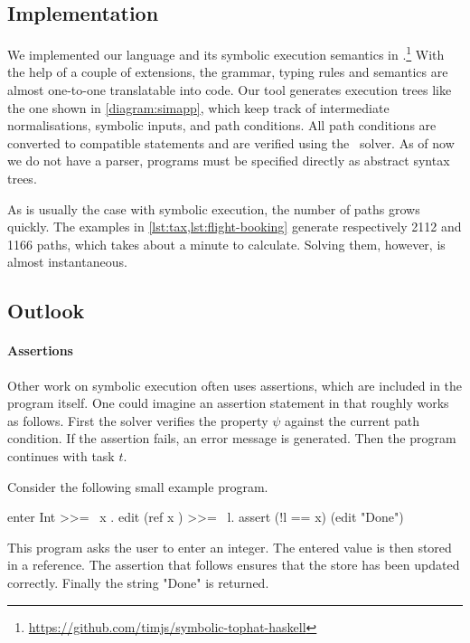 \subsection{Implementation}

We implemented our language and its symbolic execution semantics in \HASKELL.\footnote{\url{https://github.com/timjs/symbolic-tophat-haskell}}
With the help of a couple of \GHC extensions, the grammar, typing rules and semantics are almost one-to-one translatable into code.
Our tool generates execution trees like the one shown in \cref{diagram:simapp},
which keep track of intermediate normalisations, symbolic inputs, and path conditions.
All path conditions are converted to \SMTLIB compatible statements and are verified using the \ZTHREE \SMT~solver.
As of now we do not have a parser, programs must be specified directly as abstract syntax trees.

As is usually the case with symbolic execution, the number of paths grows quickly.
The examples in \cref{lst:tax,lst:flight-booking} generate respectively 2112 and 1166 paths,
which takes about a minute to calculate.
Solving them, however, is almost instantaneous.



\subsection{Outlook}
\label{subsec:outlook}

\paragraph{Assertions}

Other work on symbolic execution often uses assertions, which are included in the program itself.
One could imagine an assertion statement  in \TOPHAT that roughly works as follows.
First the \SMT solver verifies the property $\psi$ against the current path condition.
If the assertion fails, an error message is generated.
Then the program continues with task $t$.

\begin{example}
  Consider the following small example program.
  \begin{TASK}
    enter Int >>= \ x . edit (ref x ) >>= \ l. assert (!l == x) (edit "Done")
  \end{TASK}

  This program asks the user to enter an integer.
  The entered value is then stored in a reference.
  The assertion that follows ensures that the store has been updated correctly.
  Finally the string "Done" is returned.
\end{example}

